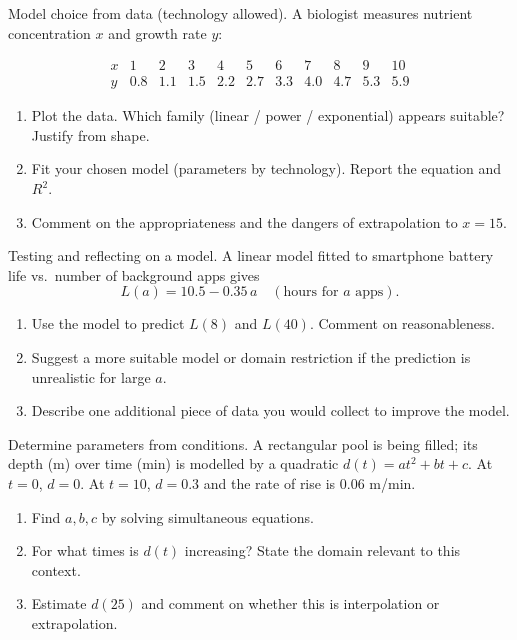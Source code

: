 \documentclass[11pt]{article}
\def\textbf#1{#1}%
\newcounter{question}
\begin{document}
\begin{question}
\textbf{Model choice from data (technology allowed).}
A biologist measures nutrient concentration $x$ and growth rate $y$:

\[
\begin{array}{c|cccccccccc}
x & 1&2&3&4&5&6&7&8&9&10\\\hline
y & 0.8&1.1&1.5&2.2&2.7&3.3&4.0&4.7&5.3&5.9
\end{array}
\]
\begin{enumerate}
  \item Plot the data. Which family (linear / power / exponential) appears suitable? Justify from shape.
  \item Fit your chosen model (parameters by technology). Report the equation and $R^2$.
  \item Comment on the appropriateness and the dangers of extrapolation to $x=15$.
\end{enumerate}
\end{question}

\begin{question}
\textbf{Testing and reflecting on a model.}
A linear model fitted to smartphone battery life vs.\ number of background apps gives
\[
L(a)=10.5-0.35\,a\quad(\text{hours for }a\text{ apps}).
\]
\begin{enumerate}
  \item Use the model to predict $L(8)$ and $L(40)$. Comment on reasonableness.
  \item Suggest a more suitable model or domain restriction if the prediction is unrealistic for large $a$.
  \item Describe one additional piece of data you would collect to improve the model.
\end{enumerate}
\end{question}

\begin{question}
\textbf{Determine parameters from conditions.}
A rectangular pool is being filled; its depth (m) over time (min) is modelled by a quadratic $d(t)=at^2+bt+c$.
At $t=0$, $d=0$. At $t=10$, $d=0.3$ and the rate of rise is $0.06$ m/min.
\begin{enumerate}
  \item Find $a,b,c$ by solving simultaneous equations.
  \item For what times is $d(t)$ increasing? State the domain relevant to this context.
  \item Estimate $d(25)$ and comment on whether this is interpolation or extrapolation.
\end{enumerate}
\end{question}
\end{document}
